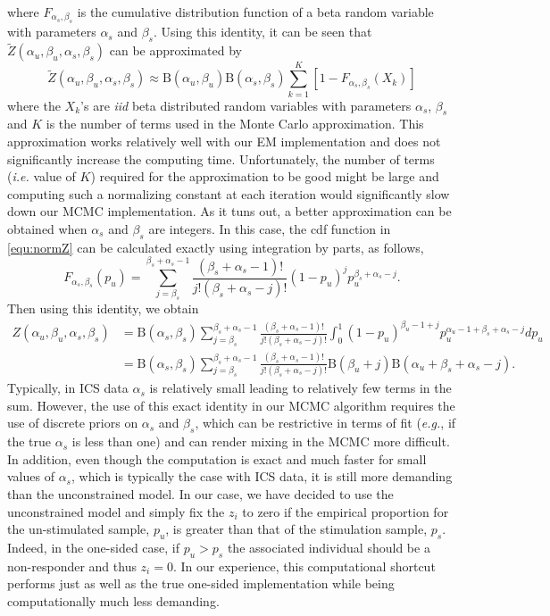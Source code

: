 \documentclass{article}
\begin{document}
where $F_{\alpha_s,\beta_s}$ is the cumulative distribution function of a beta random variable with parameters $\alpha_s$ and $\beta_s$. Using this identity, it can be seen that $\tilde{Z}(\alpha_u, \beta_u, \alpha_s, \beta_s)$ can be approximated by
\[
\tilde{Z}(\alpha_u, \beta_u, \alpha_s, \beta_s)\approx\mathrm{B}(\alpha_u,\beta_u)\mathrm{B}(\alpha_s,\beta_s)\sum_{k=1}^K[1-F_{\alpha_s,\beta_s}(X_k)]
\]
where the $X_k$'s are \textit{iid} beta distributed random variables with parameters $\alpha_s$, $\beta_s$ and $K$ is the number of terms used in the Monte Carlo approximation. This approximation works relatively well with our EM implementation and does not significantly increase the computing time.
Unfortunately, the number of terms (\textit{i.e.} value of $K$) required for the approximation to be good might be large and computing such a normalizing constant at each iteration would significantly slow down our MCMC implementation. As it tuns out, a better approximation
can be obtained when $\alpha_s$ and $\beta_s$ are integers. In this case, the cdf function in \eqref{equ:normZ} can be calculated exactly using integration by parts, as follows,
\[
F_{\alpha_s,\beta_s}(p_u)=\sum_{j=\beta_s}^{\beta_s+\alpha_s-1} \frac{(\beta_s+\alpha_s-1)!}{j!(\beta_s+\alpha_s-j)!}(1-p_u)^jp_u^{\beta_s+\alpha_s-j}.
\label{eq:IBident}
\]
Then using this identity, we obtain
\begin{align*}
Z(\alpha_u, \beta_u, \alpha_s, \beta_s)&=\mathrm{B}(\alpha_s,\beta_s)\sum_{j=\beta_s}^{\beta_s+\alpha_s-1}\frac{(\beta_s+\alpha_s-1)!}{j!(\beta_s+\alpha_s-j)!}\int_{0}^1(1-p_u)^{\beta_u-1+j}p_u^{\alpha_u-1+\beta_s+\alpha_s-j}dp_u\\
&=\mathrm{B}(\alpha_s,\beta_s)\sum_{j=\beta_s}^{\beta_s+\alpha_s-1}\frac{(\beta_s+\alpha_s-1)!}{j!(\beta_s+\alpha_s-j)!}\mathrm{B}(\beta_u+j)\mathrm{B}(\alpha_u+\beta_s+\alpha_s-j).
\label{equ:normZ}
\end{align*}
Typically, in ICS data $\alpha_s$ is relatively small leading to relatively few terms in the sum. However, the use of this exact identity in our MCMC algorithm requires the use of discrete priors on $\alpha_s$ and $\beta_s$, which can be restrictive in terms of fit (\textit{e.g.},  if the true $\alpha_s$ is less than one) and can render mixing in the MCMC more difficult. In addition, even though the computation is exact and much faster for small values of $\alpha_s$, which is typically the case with ICS data, it is still more demanding than the unconstrained model. In our case, we have decided to use the unconstrained model and simply fix the $z_i$ to zero if the empirical proportion for the un-stimulated sample, $p_u$, is greater than that of the stimulation sample, $p_s$. Indeed, in the one-sided case, if $p_u>p_s$ the associated individual should be a non-responder and thus $z_i=0$. In our experience, this computational shortcut performs just as well as the true one-sided implementation while being computationally much less demanding.
\end{document}
